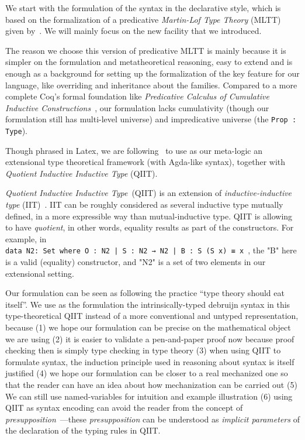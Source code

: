 We start with the formulation of the syntax in the declarative style, which is based on the
formalization of a predicative \textit{Martin-Lof Type Theory} (MLTT)~\cite{martin1982constructive}
given by~\citet{coquand2018canonicity}. We will mainly focus on the new facility that we introduced. 

The reason we choose this version of predicative MLTT is mainly because it is simpler on the formulation and metatheoretical reasoning, easy to extend and is enough as a background for setting up the formalization of the key feature for our language, like overriding and inheritance about the families. Compared to a more complete Coq's formal foundation like \textit{Predicative Calculus of Cumulative Inductive Constructions}~\cite{timany2018cumulative}, our formulation lacks cumulativity (though our formulation still has multi-level universe) and impredicative universe (the \texttt{Prop : Type}). 


Though phrased in Latex, we are following~\citet{altkap2016} to use as
our meta-logic an extensional type theoretical framework (with Agda-like syntax), 
together with \textit{Quotient Inductive Inductive Type} (QIIT). 

\textit{Quotient Inductive Inductive Type}~(QIIT) is an extension of \textit{inductive-inductive type} (IIT)~\cite{nordvall2010inductive}. IIT can be roughly considered as several inductive type mutually defined, in a more expressible way than mutual-inductive type. QIIT is allowing to have \textit{quotient}, in other words, equality results as part of the constructors. For example, in \\ \texttt{data N2: Set where O : N2 | S : N2 → N2 | B : S (S x) ≡ x }, the "B" here is a valid (equality) constructor, and "N2" is a set of two elements in our extensional setting.

Our formulation can be seen as following the practice ``type theory should eat itself''\cite{dybjer1995internal, chapman2009type}. We use as the formulation the intrinsically-typed debruijn syntax in this type-theoretical QIIT instead of a more conventional and untyped representation, because (1) we hope our formulation can be precise on the mathematical object we are using (2) it is easier to validate a pen-and-paper proof now because proof checking then is simply type checking in type theory (3) when using QIIT to formulate syntax, the induction principle used in reasoning about syntax is itself justified (4) we hope our formulation can be closer to a real mechanized one so that the reader can have an idea about how mechanization can be carried out (5) We can still use named-variables for intuition and example illustration (6) using QIIT as syntax encoding can avoid the reader from the concept of \textit{presupposition}~\cite{gratzer-sterling-birkedal-2019}---these \textit{presupposition} can be understood as \textit{implicit parameters} of the declaration of the typing rules in QIIT.

